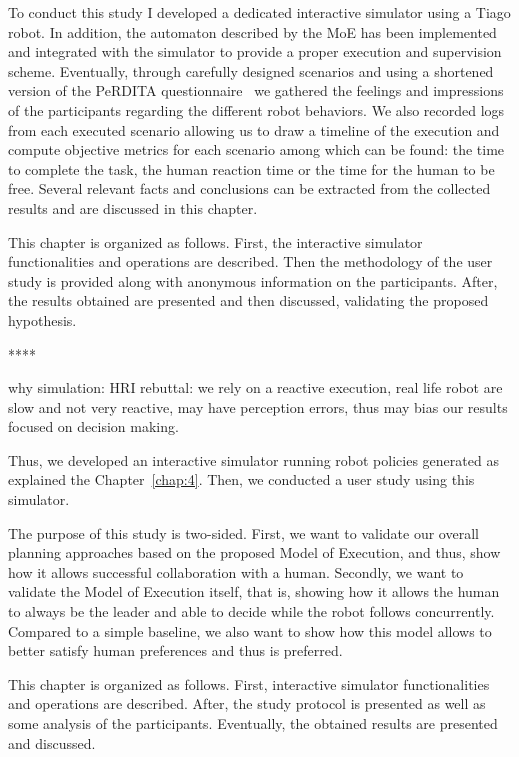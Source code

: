 To conduct this study I developed a dedicated interactive simulator using a Tiago robot. In addition, the automaton described by the MoE has been implemented and integrated with the simulator to provide a proper execution and supervision scheme. Eventually, through carefully designed scenarios and using a shortened version of the PeRDITA questionnaire~\cite{devin_evaluating_2018} we gathered the feelings and impressions of the participants regarding the different robot behaviors. We also recorded logs from each executed scenario allowing us to draw a timeline of the execution and compute objective metrics for each scenario among which can be found: the time to complete the task, the human reaction time or the time for the human to be free. Several relevant facts and conclusions can be extracted from the collected results and are discussed in this chapter.

This chapter is organized as follows. First, the interactive simulator functionalities and operations are described. Then the methodology of the user study is provided along with anonymous information on the participants. After, the results obtained are presented and then discussed, validating the proposed hypothesis.

****

why simulation: HRI rebuttal: we rely on a reactive execution, real life robot are slow and not very reactive, may have perception errors, thus may bias our results focused on decision making.

Thus, we developed an interactive simulator running robot policies generated as explained the Chapter~\ref{chap:4}. Then, we conducted a user study using this simulator.

The purpose of this study is two-sided. First, we want to validate our overall planning approaches based on the proposed Model of Execution, and thus, show how it allows successful collaboration with a human. Secondly, we want to validate the Model of Execution itself, that is, showing how it allows the human to always be the leader and able to decide while the robot follows concurrently. Compared to a simple baseline, we also want to show how this model allows to better satisfy human preferences and thus is preferred. 

This chapter is organized as follows. First, interactive simulator functionalities and operations are described. After, the study protocol is presented as well as some analysis of the participants. Eventually, the obtained results are presented and discussed.

